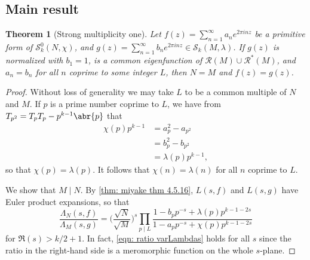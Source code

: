 \documentclass[10pt,leqno,twoside]{article}
\theoremstyle{plain}
\newtheorem{theorem}[lem]{Theorem}
\theoremstyle{definition}
\numberwithin{equation}{section}
\numberwithin{lem}{section}
\begin{document}
\subsection{Main result}
\begin{theorem}[Strong multiplicity one]\label{thm: sm1 miyake thm 4.6.19}
    Let $f(z) = \sum_{n=1}^\infty a_ne^{2\pi i nz}$ be a primitive form of $\mathcal S_k^0(N,\chi)$, and $g(z) = \sum_{n=1}^\infty b_ne^{2\pi i n z}\in \mathcal S_k(M,\lambda)$. If $g(z)$ is normalized with $b_1 = 1$, is a common eigenfunction of $\mathcal R(M)\cup \mathcal R^\ast(M)$, and $a_n = b_n$ for all $n$ coprime to some integer $L$, then $N = M$ and $f(z) = g(z)$.
\end{theorem}
\begin{proof}
    Without loss of generality we may take $L$ to be a common multiple of $N$ and $M$. If $p$ is a prime number coprime to $L$, we have from $T_{p^2} = T_pT_p - p^{k-1}\abr{p}$ that
    \begin{align*}
        \chi(p)p^{k-1} &= a_p^2 - a_{p^2} \\
        &= b_p^2 - b_{p^2} \\
        &= \lambda(p)p^{k-1},
    \end{align*} so that $\chi(p) = \lambda(p)$. It follows that $\chi(n) = \lambda(n)$ for all $n$ coprime to $L$.

    We show that $M\mid N$. By \cref{thm: miyake thm 4.5.16}, $L(s,f)$ and $L(s,g)$ have Euler product expansions, so that
    \begin{equation}\label{eqn: ratio varLambdas}
        \frac{\varLambda_N(s,f)}{\varLambda_M(s,g)} = \bigg(\frac{\sqrt{N}}{\sqrt{M}}\bigg)^s\prod_{p\mid L}\frac{1-b_pp^{-s} + \lambda(p)p^{k-1-2s}}{1-a_pp^{-s} + \chi(p)p^{k-1-2s}}
    \end{equation} for $\Re(s)>k/2+1$. In fact, \cref{eqn: ratio varLambdas} holds for all $s$ since the ratio in the right-hand side is a meromorphic function on the whole $s$-plane.


\end{proof}
\end{document}
